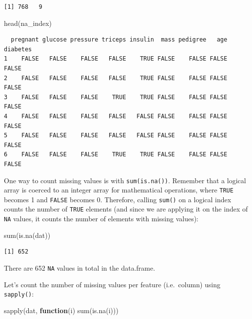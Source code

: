\documentclass[
]{book}
\newenvironment{Shaded}{\begin{snugshade}}{\end{snugshade}}
\newcommand{\ControlFlowTok}[1]{\textcolor[rgb]{0.13,0.29,0.53}{\textbf{#1}}}
\newcommand{\FunctionTok}[1]{\textcolor[rgb]{0.00,0.00,0.00}{#1}}
\newcommand{\NormalTok}[1]{#1}
\begin{document}
\begin{verbatim}
[1] 768   9
\end{verbatim}

\begin{Shaded}
\begin{Highlighting}[]
\FunctionTok{head}\NormalTok{(na\_index)}
\end{Highlighting}
\end{Shaded}

\begin{verbatim}
  pregnant glucose pressure triceps insulin  mass pedigree   age diabetes
1    FALSE   FALSE    FALSE   FALSE    TRUE FALSE    FALSE FALSE    FALSE
2    FALSE   FALSE    FALSE   FALSE    TRUE FALSE    FALSE FALSE    FALSE
3    FALSE   FALSE    FALSE    TRUE    TRUE FALSE    FALSE FALSE    FALSE
4    FALSE   FALSE    FALSE   FALSE   FALSE FALSE    FALSE FALSE    FALSE
5    FALSE   FALSE    FALSE   FALSE   FALSE FALSE    FALSE FALSE    FALSE
6    FALSE   FALSE    FALSE    TRUE    TRUE FALSE    FALSE FALSE    FALSE
\end{verbatim}

One way to count missing values is with \texttt{sum(is.na())}. Remember that a logical array is coerced to an integer array for mathematical operations, where \texttt{TRUE} becomes 1 and \texttt{FALSE} becomes 0. Therefore, calling \texttt{sum()} on a logical index counts the number of \texttt{TRUE} elements (and since we are applying it on the index of \texttt{NA} values, it counts the number of elements with missing values):

\begin{Shaded}
\begin{Highlighting}[]
\FunctionTok{sum}\NormalTok{(}\FunctionTok{is.na}\NormalTok{(dat))}
\end{Highlighting}
\end{Shaded}

\begin{verbatim}
[1] 652
\end{verbatim}

There are 652 \texttt{NA} values in total in the data.frame.

Let's count the number of missing values per feature (i.e.~column) using \texttt{sapply()}:

\begin{Shaded}
\begin{Highlighting}[]
\FunctionTok{sapply}\NormalTok{(dat, }\ControlFlowTok{function}\NormalTok{(i) }\FunctionTok{sum}\NormalTok{(}\FunctionTok{is.na}\NormalTok{(i)))}
\end{Highlighting}
\end{Shaded}
\end{document}
